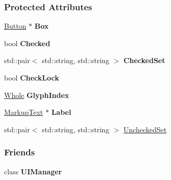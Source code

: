 \subsubsection*{Protected Attributes}
\begin{DoxyCompactItemize}
\item 
\hypertarget{classphys_1_1UI_1_1CheckBox_a1118ba10131845d77085bc1b9e41fdab}{
\hyperlink{classphys_1_1UI_1_1Button}{Button} $\ast$ {\bfseries Box}}
\label{classphys_1_1UI_1_1CheckBox_a1118ba10131845d77085bc1b9e41fdab}

\item 
\hypertarget{classphys_1_1UI_1_1CheckBox_af539bce89119b8e21fa19f170cc5d7e5}{
bool {\bfseries Checked}}
\label{classphys_1_1UI_1_1CheckBox_af539bce89119b8e21fa19f170cc5d7e5}

\item 
\hypertarget{classphys_1_1UI_1_1CheckBox_ae4bb7dad2474b7f74ebe1320fef7a58e}{
std::pair$<$ std::string, std::string $>$ {\bfseries CheckedSet}}
\label{classphys_1_1UI_1_1CheckBox_ae4bb7dad2474b7f74ebe1320fef7a58e}

\item 
\hypertarget{classphys_1_1UI_1_1CheckBox_ae8f71565ce43129a44930131850d6e16}{
bool {\bfseries CheckLock}}
\label{classphys_1_1UI_1_1CheckBox_ae8f71565ce43129a44930131850d6e16}

\item 
\hypertarget{classphys_1_1UI_1_1CheckBox_afc37b1eaaf6ab441a71569757802571b}{
\hyperlink{namespacephys_a460f6bc24c8dd347b05e0366ae34f34a}{Whole} {\bfseries GlyphIndex}}
\label{classphys_1_1UI_1_1CheckBox_afc37b1eaaf6ab441a71569757802571b}

\item 
\hypertarget{classphys_1_1UI_1_1CheckBox_a99640351f23baac8e36ef3d64140e404}{
\hyperlink{classphys_1_1UI_1_1MarkupText}{MarkupText} $\ast$ {\bfseries Label}}
\label{classphys_1_1UI_1_1CheckBox_a99640351f23baac8e36ef3d64140e404}

\item 
std::pair$<$ std::string, std::string $>$ \hyperlink{classphys_1_1UI_1_1CheckBox_a7b670d93f119193283ec78b94f842429}{UncheckedSet}
\end{DoxyCompactItemize}
\subsubsection*{Friends}
\begin{DoxyCompactItemize}
\item 
\hypertarget{classphys_1_1UI_1_1CheckBox_ab811b36cd63b54fe42b6acb231ea21bc}{
class {\bfseries UIManager}}
\label{classphys_1_1UI_1_1CheckBox_ab811b36cd63b54fe42b6acb231ea21bc}

\end{DoxyCompactItemize}


